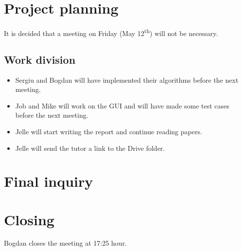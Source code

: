 \documentclass[a4paper,twoside,11pt]{article}
\newcommand{\ts}{\textsuperscript}
\begin{document}
	
	\section{Project planning}
	
	It is decided that a meeting on Friday (May 12\ts{th}) will not be necessary.
	
	\subsection{Work division}
	
	\begin{itemize}
	    \item Sergiu and Bogdan will have implemented their algorithms before the next meeting.
	    \item Job and Mike will work on the GUI and will have made some test cases before the next meeting.
	    \item Jelle will start writing the report and continue reading papers.
	    \item Jelle will send the tutor a link to the Drive folder.
	\end{itemize}
	
	
	\section{Final inquiry}
	
		
    \section{Closing}
    
    Bogdan closes the meeting at 17:25 hour.
    
	
\end{document}
